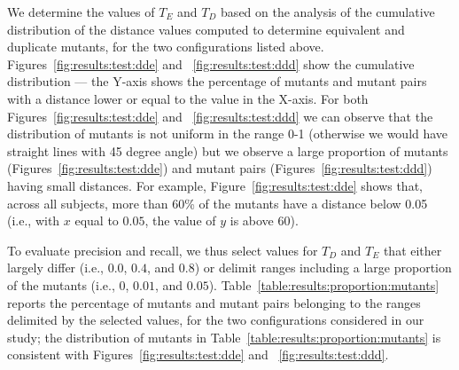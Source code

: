 We determine the values of $T_E$ and $T_D$ based on the analysis of the
cumulative distribution of the distance values computed to determine equivalent and duplicate mutants, for the two configurations listed above.
Figures~\ref{fig:results:test:dde} and
~\ref{fig:results:test:ddd}
show the cumulative distribution --- the Y-axis shows the percentage of mutants and mutant pairs with a distance lower or equal to the value in the X-axis.
For both Figures~\ref{fig:results:test:dde} and
~\ref{fig:results:test:ddd} we can observe that the distribution of mutants is not uniform in the range 0-1 (otherwise we would have straight lines with 45 degree angle) but we observe a large proportion of mutants (Figures~\ref{fig:results:test:dde}) and mutant pairs (Figures~\ref{fig:results:test:ddd}) having small distances. For example,
Figure~\ref{fig:results:test:dde} shows that, across all subjects, more than 60\% of the mutants have a distance below 0.05 (i.e., with $x$ equal to $0.05$, the value of $y$ is above $60$).

To evaluate precision and recall, we thus select values for $T_D$ and $T_E$ that
either largely differ (i.e., $0.0$, $0.4$, and $0.8$) or delimit ranges including a large proportion of the mutants (i.e., $0$, $0.01$, and $0.05$). Table~\ref{table:results:proportion:mutants} reports the percentage of mutants and mutant pairs belonging to the ranges delimited by the selected values, for the two configurations considered in our study; the distribution of mutants in Table~\ref{table:results:proportion:mutants} is consistent with Figures~\ref{fig:results:test:dde} and
~\ref{fig:results:test:ddd}.









